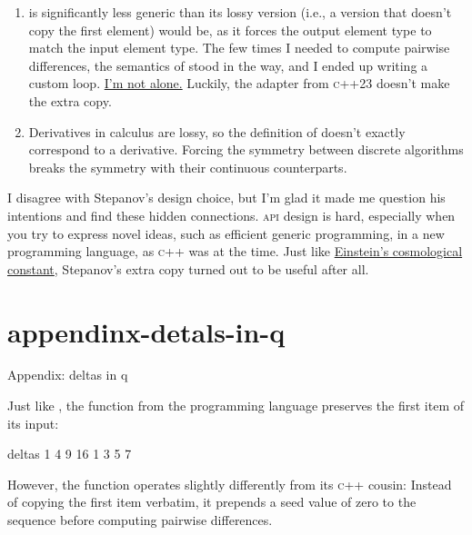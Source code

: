 \documentclass{article}
\begin{document}
\begin{enumerate}
\item
   is significantly less generic than its lossy version
  (i.e., a version that doesn't copy the first element) would be,
  as it forces the output element type to match the input element type.
  The few times I needed to compute pairwise differences,
  the semantics of  stood in the way,
  and I ended up writing a custom loop.
  \href{https://stackoverflow.com/questions/8267806/implicit-transformation-while-calling-stdadjacent-difference}{I'm not alone.}
  Luckily, the \href{https://en.cppreference.com/w/cpp/ranges/adjacent_transform_view.html}{} adapter from \textsc{c++23} doesn't make the extra copy.

\item
  Derivatives in calculus are lossy,
  so the definition of  doesn't exactly correspond to a derivative.
  Forcing the symmetry between discrete algorithms breaks the symmetry with their continuous counterparts.
\end{enumerate}

I disagree with Stepanov's design choice,
but I'm glad it made me question his intentions and find these hidden connections.
\textsc{api} design is hard,
especially when you try to express novel ideas,
such as efficient generic programming,
in a new programming language,
as \textsc{c++} was at the time.
Just like \href{https://en.wikipedia.org/wiki/Cosmological_constant}{Einstein's cosmological constant},
Stepanov's extra copy turned out to be useful after all.

\section{appendinx-detals-in-q}{Appendix: deltas in q}

Just like ,
the \href{https://code.kx.com/q/ref/deltas/}{} function from the \href{https://code.kx.com/q/learn/startingkdb/language/}{} programming language preserves the first item of its input:

\begin{code}[q]
deltas 1 4 9 16
1 3 5 7
\end{code}

However, the  function operates slightly differently from its \textsc{c++} cousin:
Instead of copying the first item verbatim,
it prepends a seed value of zero to the sequence before computing pairwise differences.
\end{document}
